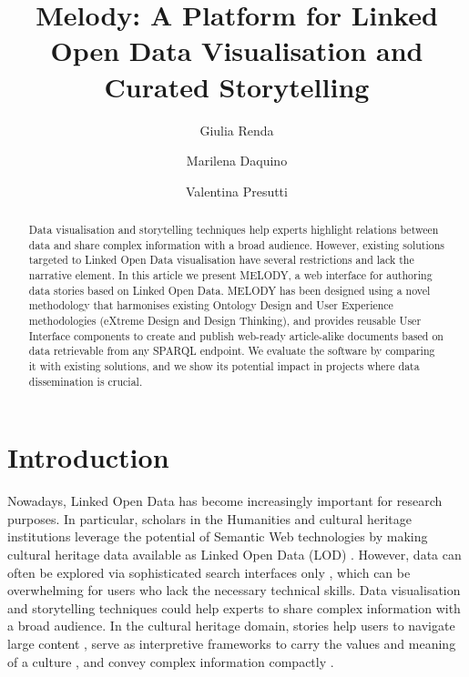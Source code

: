 \documentclass[manuscript]
{acmart}
\begin{document}
\title{Melody: A Platform for Linked Open Data Visualisation and Curated Storytelling}

\author{Giulia Renda}
\author{Marilena Daquino}
\author{Valentina Presutti}

\begin{abstract}
    Data visualisation and storytelling techniques help experts highlight relations between data and share complex information with a broad audience. However, existing solutions targeted to Linked Open Data visualisation have several restrictions and lack the narrative element. In this article we present MELODY, a web interface for authoring data stories based on Linked Open Data. MELODY has been designed using a novel methodology that harmonises existing Ontology Design and User Experience methodologies (eXtreme Design and Design Thinking), and provides reusable User Interface components to create and publish web-ready article-alike documents based on data retrievable from any SPARQL endpoint. We evaluate the software by comparing it with existing solutions, and we show its potential impact in projects where data dissemination is crucial.
\end{abstract}


\maketitle

\section{Introduction}
Nowadays, Linked Open Data has become increasingly important for research purposes. In particular, scholars in the Humanities and cultural heritage institutions leverage the potential of Semantic Web technologies by making cultural heritage data available as Linked Open Data (LOD) \cite{hyvonen_using_2020}. However, data can often be explored via sophisticated search interfaces only \cite{monaco_linked_2022}, which can be overwhelming for users who lack the necessary technical skills.
Data visualisation and storytelling techniques could help experts to share complex information with a broad audience. In the cultural heritage domain, stories help users to navigate large content \cite{fernie_paths_2012}, serve as interpretive frameworks to carry the values and meaning of a culture \cite{bruner_narrative_1991}, and convey complex information compactly \cite{gershon_what_2001, lombardo_storytelling_2012}.
\end{document}
